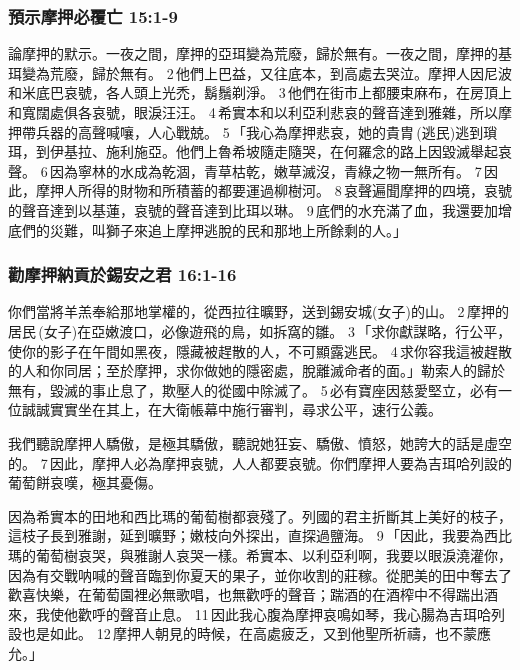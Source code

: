 \subsubsection{預示摩押必覆亡 15:1-9}


論摩押的默示。一夜之間，摩押的亞珥變為荒廢，歸於無有。一夜之間，摩押的基珥變為荒廢，歸於無有。 2 他們上巴益，又往底本，到高處去哭泣。摩押人因尼波和米底巴哀號，各人頭上光禿，鬍鬚剃淨。 3 他們在街市上都腰束麻布，在房頂上和寬闊處俱各哀號，眼淚汪汪。 4 希實本和以利亞利悲哀的聲音達到雅雜，所以摩押帶兵器的高聲喊嚷，人心戰兢。 5 「我心為摩押悲哀，她的貴胄 (逃民)逃到瑣珥，到伊基拉、施利施亞。他們上魯希坡隨走隨哭，在何羅念的路上因毀滅舉起哀聲。 6 因為寧林的水成為乾涸，青草枯乾，嫩草滅沒，青綠之物一無所有。 7 因此，摩押人所得的財物和所積蓄的都要運過柳樹河。 8 哀聲遍聞摩押的四境，哀號的聲音達到以基蓮，哀號的聲音達到比珥以琳。 9 底們的水充滿了血，我還要加增底們的災難，叫獅子來追上摩押逃脫的民和那地上所餘剩的人。」

\subsubsection{勸摩押納貢於錫安之君 16:1-16}
你們當將羊羔奉給那地掌權的，從西拉往曠野，送到錫安城(女子)的山。 2 摩押的居民 (女子)在亞嫩渡口，必像遊飛的鳥，如拆窩的雛。 3 「求你獻謀略，行公平，使你的影子在午間如黑夜，隱藏被趕散的人，不可顯露逃民。 4 求你容我這被趕散的人和你同居；至於摩押，求你做她的隱密處，脫離滅命者的面。」勒索人的歸於無有，毀滅的事止息了，欺壓人的從國中除滅了。 5 必有寶座因慈愛堅立，必有一位誠誠實實坐在其上，在大衛帳幕中施行審判，尋求公平，速行公義。

我們聽說摩押人驕傲，是極其驕傲，聽說她狂妄、驕傲、憤怒，她誇大的話是虛空的。 7 因此，摩押人必為摩押哀號，人人都要哀號。你們摩押人要為吉珥哈列設的葡萄餅哀嘆，極其憂傷。

因為希實本的田地和西比瑪的葡萄樹都衰殘了。列國的君主折斷其上美好的枝子，這枝子長到雅謝，延到曠野；嫩枝向外探出，直探過鹽海。 9 「因此，我要為西比瑪的葡萄樹哀哭，與雅謝人哀哭一樣。希實本、以利亞利啊，我要以眼淚澆灌你，因為有交戰呐喊的聲音臨到你夏天的果子，並你收割的莊稼。從肥美的田中奪去了歡喜快樂，在葡萄園裡必無歌唱，也無歡呼的聲音；踹酒的在酒榨中不得踹出酒來，我使他歡呼的聲音止息。 11 因此我心腹為摩押哀鳴如琴，我心腸為吉珥哈列設也是如此。 12 摩押人朝見的時候，在高處疲乏，又到他聖所祈禱，也不蒙應允。」

